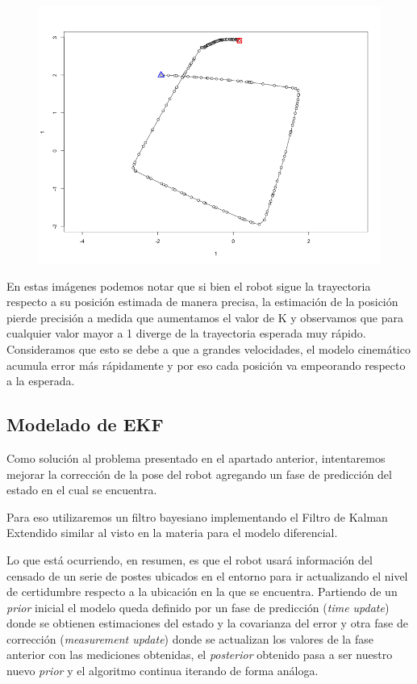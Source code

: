 \begin{figure}[!htb]
\begin{center}
\includegraphics[width=\linewidth/2]{imagenesTrayectorias/lazocerrado/lazocerrado4.png}
\end{center}
\end{figure}
\FloatBarrier

En estas imágenes podemos notar que si bien el robot sigue la trayectoria respecto a su posición estimada de manera precisa, la estimación de la posición pierde precisión a medida que aumentamos el valor de K y observamos que para cualquier valor mayor a 1 diverge de la trayectoria esperada muy rápido. Consideramos que esto se debe a que a grandes velocidades, el modelo cinemático acumula error más rápidamente y por eso cada posición va empeorando respecto a la esperada.

\subsection{Modelado de EKF}

Como solución al problema presentado en el apartado anterior, intentaremos mejorar la corrección de la pose del robot agregando un fase de predicción del estado en el cual se encuentra.

Para eso utilizaremos un filtro bayesiano implementando el Filtro de Kalman Extendido similar al visto en la materia para el modelo diferencial.

Lo que está ocurriendo, en resumen, es que el robot usará información del censado de un serie de postes ubicados en el entorno para ir actualizando el nivel de certidumbre respecto a la ubicación en la que se encuentra. Partiendo de un \textit{prior} inicial el modelo queda definido por un fase de predicción (\textit{time update}) donde se obtienen estimaciones del estado y la covarianza del error y otra fase de corrección (\textit{measurement update}) donde se actualizan los valores de la fase anterior con las mediciones obtenidas, el \textit{posterior} obtenido pasa a ser nuestro nuevo \textit{prior} y el algoritmo continua iterando de forma análoga.


